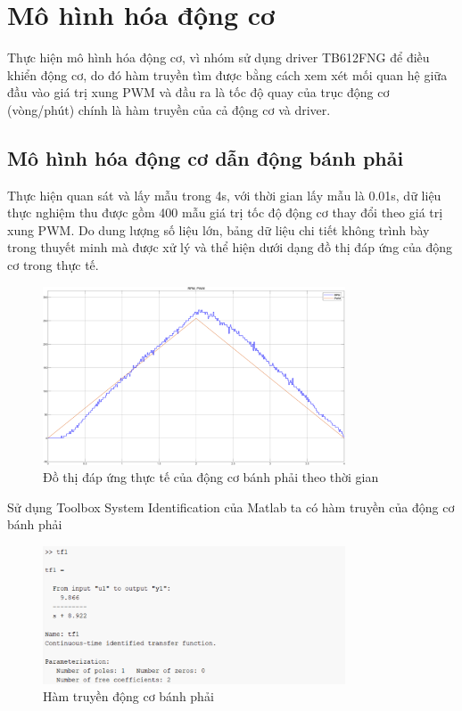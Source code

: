      \section{Mô hình hóa động cơ}
          \hspace*{0.6cm}Thực hiện mô hình hóa động cơ, vì nhóm sử dụng driver TB612FNG để điều khiển động cơ, do đó hàm truyền tìm được bằng cách xem xét mối quan hệ giữa đầu vào giá trị xung PWM và đầu ra là tốc độ quay của trục động cơ (vòng/phút) chính là hàm truyền của cả động cơ và driver.   
          \subsection{Mô hình hóa động cơ dẫn động bánh phải}    
               \hspace*{0.6cm}Thực hiện quan sát và lấy mẫu trong 4s, với thời gian lấy mẫu là 0.01s, dữ liệu thực nghiệm thu được gồm 400 mẫu giá trị tốc độ động cơ thay đổi theo giá trị xung PWM. Do dung lượng số liệu lớn, 
               bảng dữ liệu chi tiết không trình bày trong thuyết minh mà được xử lý và thể hiện dưới dạng đồ thị đáp ứng của động cơ trong thực tế. 
               \begin{figure}[H]
                    \centering
                    \includegraphics[width=0.8\textwidth]{pictures/chapter5/CJGB1_response.png}
                    \caption{Đồ thị đáp ứng thực tế của động cơ bánh phải theo thời gian}
                    \label{CJGB1_response}
               \end{figure}  
               \hspace*{0.6cm}Sử dụng Toolbox System Identification của Matlab ta có hàm truyền của động cơ bánh phải 
               \begin{figure}[H]
                    \centering
                    \includegraphics[width=0.8\textwidth]{pictures/chapter5/CJGB1_tf.png}
                    \caption{Hàm truyền động cơ bánh phải}
                    \label{CJGB1_tf}
               \end{figure} 
